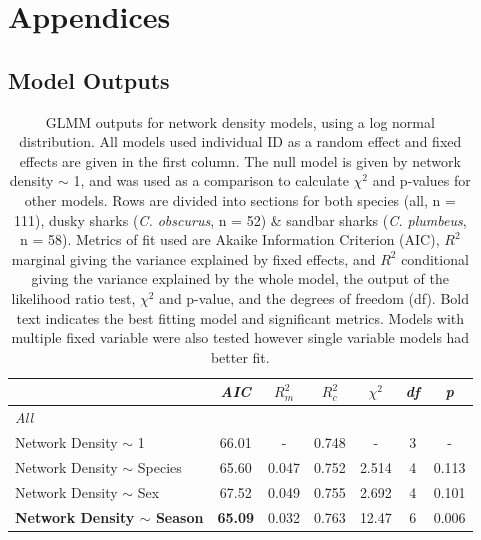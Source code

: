 \documentclass[11pt,a4paper]{article}
\begin{document}
	
	
	\newpage
	
	
	\section{Appendices}
	
	\setcounter{table}{0}
	\renewcommand{\thetable}{A\arabic{table}}
	
	\subsection{Model Outputs}
	
	
	\begin{table}[h!]
		\caption{GLMM outputs for network density models, using a log normal distribution. All models used individual ID as a random effect and fixed effects are given in the first column. The null model is given by network density $\sim$ 1, and was used as a comparison to calculate $\chi^2$ and p-values for other models. Rows are divided into sections for both species (all, n = 111), dusky sharks (\textit{C. obscurus}, n = 52) \& sandbar sharks (\textit{C. plumbeus}, n = 58). Metrics of fit used are Akaike Information Criterion (AIC), $R^2$ marginal giving the variance explained by fixed effects, and $R^2$ conditional giving the variance explained by the whole model, the output of the likelihood ratio test, $\chi^2$ and p-value, and the degrees of freedom (df). Bold text indicates the best fitting model and significant metrics. Models with multiple fixed variable were also tested however single variable models had better fit.}
		\centering
		\begin{tabular}{@{}lcccccc@{}}
			& \textit{AIC} & {$R^2_m$} & {$R^2_c$} & {$\chi^2$} & \textit{df} & \textit{p}      \\ 
			\midrule
			\textit{All}                           &              &              &              &               &             &                 \\
			Network Density $\sim$ 1 & 66.01 & -  & 0.748 & - & 3 & - \\
			Network Density $\sim$ Species          & 65.60        & 0.047        & 0.752        & 2.514         & 4           & 0.113           \\
			Network Density $\sim$ Sex              & 67.52        & 0.049        & 0.755        & 2.692         & 4           & 0.101           \\
			\textbf{Network Density $\sim$ Season}           & \textbf{65.09}        & 0.032        & 0.763        & 12.47         & 6           & 0.006           \\

\end{tabular}
\end{table}
\end{document}
